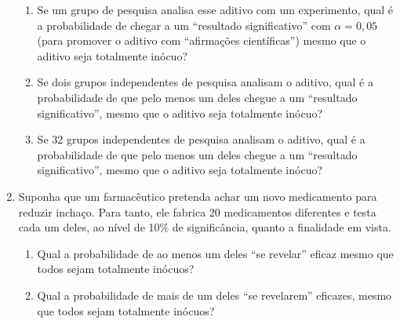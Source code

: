 \documentclass[10pt,brazil,addpoints]{exam}
\begin{document}
\begin{enumerate}[1.]
\begin{enumerate}[\bf (a)]
\item  Se um grupo de pesquisa analisa esse aditivo com um experimento, qual é a probabilidade de chegar a um ``resultado significativo'' com $\alpha = 0,05$ (para promover o aditivo com “afirmações científicas”) mesmo que o aditivo seja totalmente inócuo?

\item Se dois grupos independentes de pesquisa analisam o aditivo, qual é a probabilidade de que pelo menos um deles chegue a um ``resultado significativo'', mesmo que o aditivo seja totalmente inócuo?

\item Se 32 grupos independentes de pesquisa analisam o aditivo, qual é a probabilidade de que pelo menos um deles chegue a um ``resultado significativo'', mesmo que o aditivo seja totalmente inócuo?
\end{enumerate}


\medskip
\item Suponha que um farmacêutico pretenda achar um novo medicamento  para reduzir inchaço. Para tanto, ele fabrica 20 medicamentos diferentes e testa cada um deles, ao nível de 10\% de significância, quanto a finalidade em vista.

\begin{enumerate}[\bf (a)]
\item Qual a probabilidade de ao menos um deles ``se revelar'' eficaz mesmo que todos sejam totalmente inócuos?

\item Qual a probabilidade de mais de um deles ``se revelarem'' eficazes, mesmo que todos sejam totalmente inócuos?
\end{enumerate}





 
\end{enumerate}
\end{document}
